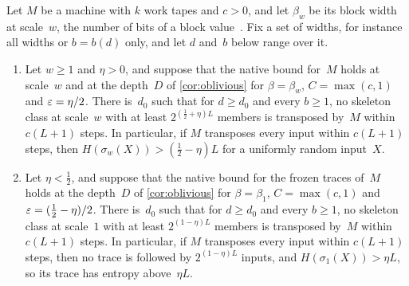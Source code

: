 \begin{corollary}\label{cor:L}
Let $M$ be a machine with $k$ work tapes and $c>0$, and let $\beta_w$ be its block width at scale~$w$, the number of bits of a
block value~\cite[Definition~4.4]{MergeDepth2026}. Fix a set of widths, for instance all widths or $b=b(d)$ only, and let
$d$ and~$b$ below range over it.
\begin{enumerate}[label=(\alph*)]
\item Let $w\ge1$ and $\eta>0$, and suppose that the native bound for~$M$ holds at scale~$w$ and at the depth~$D$ of
\cref{cor:oblivious} for $\beta=\beta_w$, $C=\max(c,1)$ and $\varepsilon=\eta/2$. There is~$d_0$ such that for $d\ge d_0$ and every $b\ge1$, no skeleton
class at scale~$w$ with at least $2^{(\frac12+\eta)L}$ members is transposed by~$M$ within $c(L+1)$ steps. In particular, if $M$
transposes every input within $c(L+1)$ steps, then $H(\sigma_w(X))>(\frac12-\eta)L$ for a uniformly random input~$X$.
\item Let $\eta<\frac12$, and suppose that the native bound for the frozen traces of~$M$ holds at the depth~$D$ of
\cref{cor:oblivious} for $\beta=\beta_1$, $C=\max(c,1)$ and $\varepsilon=(\frac12-\eta)/2$. There is~$d_0$ such that for $d\ge d_0$ and
every $b\ge1$, no skeleton class at scale~$1$ with at least $2^{(1-\eta)L}$ members is transposed by~$M$ within $c(L+1)$ steps.
In particular, if $M$ transposes every input within $c(L+1)$ steps, then no trace is followed by $2^{(1-\eta)L}$ inputs, and
$H(\sigma_1(X))>\eta L$, so its trace has entropy above~$\eta L$.
\end{enumerate}
\end{corollary}

